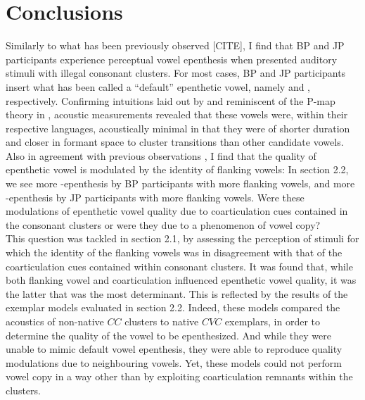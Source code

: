 \newpage
\section{Conclusions}


{\color{blue}Similarly to what has been previously observed \cite{dupoux1999, dehaene2000, dupoux2011, monahan2009, mattingley2015}[CITE], I find that BP and JP participants experience perceptual vowel epenthesis when presented auditory stimuli with illegal consonant clusters. For most cases, BP and JP participants insert what has been called a ``default'' epenthetic vowel, namely  and , respectively. Confirming intuitions laid out by \cite{dupoux2011} and reminiscent of the {\color{red}P-map theory in \cite{steriade2001}}, acoustic measurements revealed that these vowels were, within their respective languages, acoustically minimal in that they were of shorter duration and closer in formant space to cluster transitions than other candidate vowels. \\

Also in agreement with previous observations \cite{dupoux2011}, I find that the quality of epenthetic vowel is modulated by the identity of flanking vowels: In {\color{red}section 2.2}, we see more -epenthesis by BP participants with more  flanking vowels, and more -epenthesis by JP participants with more  flanking vowels. Were these modulations of epenthetic vowel quality due to coarticulation cues contained in the consonant clusters or were they due to a phenomenon of vowel copy? \\

This question was tackled in {\color{red}section 2.1}, by assessing the perception of stimuli for which the identity of the flanking vowels was in disagreement with that of the coarticulation cues contained within consonant clusters. It was found that, while both flanking vowel and coarticulation influenced epenthetic vowel quality, it was the latter that was the most determinant. This is reflected by the results of the exemplar models evaluated in {\color{red}section 2.2}. Indeed, these models compared the acoustics of non-native $CC$ clusters to native $CVC$ exemplars, in order to determine the quality of the vowel to be epenthesized. And while they were unable to mimic default vowel epenthesis, they were able to reproduce quality modulations due to neighbouring vowels. Yet, these models could not perform vowel copy in a way other than by exploiting coarticulation remnants within the clusters. \\             

}
